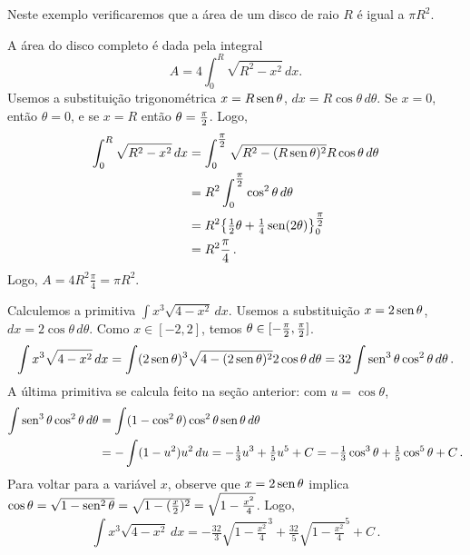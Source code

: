 \begin{ex} Neste exemplo verificaremos que a área de um disco de raio $R$ é
igual a $\pi R^2$.
\begin{center}
\begin{bmlimage}\end{bmlimage}
\end{center}
A área do disco completo é dada pela integral
$$
A=4\int_{0}^R\sqrt{R^2-x^2}\,dx.
$$
Usemos a substituição trigonométrica $x=R\operatorname{sen} \theta$, $dx=R\cos
\theta\,d\theta$. Se $x=0$, então $\theta=0$, e se $x=R$
então $\theta=\tfrac{\pi}{2}$. Logo,
\begin{align*}
 \int_{0}^R\sqrt{R^2-x^2}\,dx&=\int_0^{\tfrac{\pi}{2}}\sqrt{R^2-(R\operatorname{sen}
\theta)^2}R\cos \theta\,d\theta\\
&=R^2\int_0^{\tfrac{\pi}{2}} \cos^2\theta\,d\theta\\
&=R^2\bigl\{\tfrac12\theta+\tfrac14\operatorname{sen}(2\theta)\bigr\}_0^{\tfrac{\pi}{2}}\\
&=R^2\frac{\pi}{4}\,.
\end{align*}
Logo, $A=4 R^2\frac{\pi}{4}=\pi R^2$.
\end{ex}

\begin{ex}
Calculemos a primitiva $\int x^3{\sqrt{4-x^2}}\,dx$. 
Usemos a substituição $x=2\operatorname{sen} \theta$, $dx=2\cos \theta\,d\theta$.
Como $x\in [-2,2]$, temos $\theta\in [-\tfrac{\pi}{2}, \tfrac{\pi}{2}]$.
$$
\int x^3{\sqrt{4-x^2}}\,dx=\int(2\operatorname{sen} \theta)^3\sqrt{4-(2\operatorname{sen} \theta)^2}2\cos
\theta\,d\theta=32\int\operatorname{sen}^3\theta\cos^2\theta\,d\theta\,.
$$
A última primitiva se calcula feito na seção anterior: com $u=\cos \theta$,
\begin{align*}
\int\operatorname{sen}^3\theta\cos^2\theta\,d\theta&=\int
(1-\cos^2\theta)\cos^2\theta\operatorname{sen}\theta\,d\theta\\
&=-\int (1-u^2)u^2\,du=-\tfrac13 u^3+\tfrac15u^5+C
=-\tfrac13 \cos^3\theta+\tfrac15\cos^5\theta+C\,.
\end{align*}
Para voltar para a variável $x$, observe que $x=2\operatorname{sen} \theta$ implica $\cos
\theta=\sqrt{1-\operatorname{sen}^2\theta}=\sqrt{1-(\tfrac{x}{2})^2}=\sqrt{1-\tfrac{x^2}{4}}$.
Logo,
$$
\int
x^3{\sqrt{4-x^2}}\,dx=-\tfrac{32}{3}\sqrt{1-\tfrac{x^2}{4}}^3+\tfrac{32}{5}\sqrt{1-\tfrac{
x^2}{4}}^5+C\,.
$$
\end{ex}

